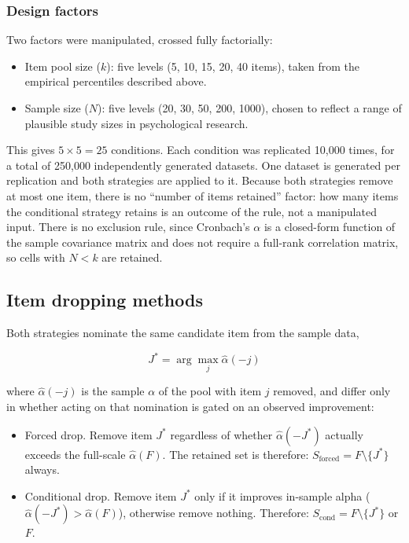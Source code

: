 \documentclass[
  nonatbib,
  authoryear,
  preprint]{elsarticle}
\providecommand{\tightlist}{%
  \setlength{\itemsep}{0pt}\setlength{\parskip}{0pt}}
\begin{document}
\subsubsection{Design factors}\label{design-factors}

Two factors were manipulated, crossed fully factorially:

\begin{itemize}
\tightlist
\item
  Item pool size (\(k\)): five levels (5, 10, 15, 20, 40 items), taken
  from the empirical percentiles described above.
\item
  Sample size (\(N\)): five levels (20, 30, 50, 200, 1000), chosen to
  reflect a range of plausible study sizes in psychological research.
\end{itemize}

This gives \(5 \times 5 = 25\) conditions. Each condition was replicated
10,000 times, for a total of 250,000 independently generated datasets.
One dataset is generated per replication and both strategies are applied
to it. Because both strategies remove at most one item, there is no
``number of items retained'' factor: how many items the conditional
strategy retains is an outcome of the rule, not a manipulated input.
There is no exclusion rule, since Cronbach's \(\alpha\) is a closed-form
function of the sample covariance matrix and does not require a
full-rank correlation matrix, so cells with \(N < k\) are retained.

\subsection{Item dropping methods}\label{item-dropping-methods}

Both strategies nominate the same candidate item from the sample data,

\[J^{*} = \arg\max_j \hat\alpha(-j)\]

where \(\hat\alpha(-j)\) is the sample \(\alpha\) of the pool with item
\(j\) removed, and differ only in whether acting on that nomination is
gated on an observed improvement:

\begin{itemize}
\tightlist
\item
  Forced drop. Remove item \(J^{*}\) regardless of whether
  \(\hat\alpha(-J^{*})\) actually exceeds the full-scale
  \(\hat\alpha(F)\). The retained set is therefore:
  \(S_{\text{forced}} = F \setminus \{J^{*}\}\) always.
\item
  Conditional drop. Remove item \(J^{*}\) only if it improves in-sample
  alpha (\(\hat\alpha(-J^{*}) > \hat\alpha(F)\)), otherwise remove
  nothing. Therefore: \(S_{\text{cond}} = F \setminus \{J^{*}\}\) or
  \(F\).
\end{itemize}
\end{document}
